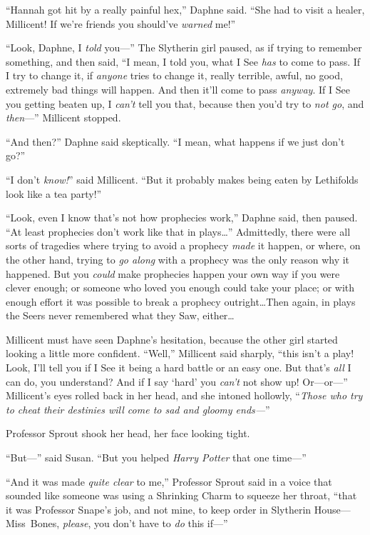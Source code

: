 “Hannah got hit by a really painful hex,” Daphne said. “She had to visit a healer, Millicent! If we’re friends you should’ve \emph{warned} me!”

“Look, Daphne, I \emph{told} you—” The Slytherin girl paused, as if trying to remember something, and then said, “I mean, I told you, what I See \emph{has} to come to pass. If I try to change it, if \emph{anyone} tries to change it, really terrible, awful, no good, extremely bad things will happen. And then it’ll come to pass \emph{anyway}. If I See you getting beaten up, I \emph{can’t} tell you that, because then you’d try to \emph{not go}, and \emph{then}—” Millicent stopped.

“And then?” Daphne said skeptically. “I mean, what happens if we just don’t go?”

“I don’t \emph{know!}” said Millicent. “But it probably makes being eaten by Lethifolds look like a tea party!”

“Look, even I know that’s not how prophecies work,” Daphne said, then paused. “At least prophecies don’t work like that in plays…” Admittedly, there were all sorts of tragedies where trying to avoid a prophecy \emph{made} it happen, or where, on the other hand, trying to \emph{go along} with a prophecy was the only reason why it happened. But you \emph{could} make prophecies happen your own way if you were clever enough; or someone who loved you enough could take your place; or with enough effort it was possible to break a prophecy outright…Then again, in plays the Seers never remembered what they Saw, either…

Millicent must have seen Daphne’s hesitation, because the other girl started looking a little more confident. “Well,” Millicent said sharply, “this isn’t a play! Look, I’ll tell you if I See it being a hard battle or an easy one. But that’s \emph{all} I can do, you understand? And if I say ‘hard’ you \emph{can’t} not show up! Or—or—” Millicent’s eyes rolled back in her head, and she intoned hollowly, “\emph{Those who try to cheat their destinies will come to sad and gloomy ends—}”

\later

Professor Sprout shook her head, her face looking tight.

“But—” said Susan. “But you helped \emph{Harry Potter} that one time—”

“And it was made \emph{quite clear} to me,” Professor Sprout said in a voice that sounded like someone was using a Shrinking Charm to squeeze her throat, “that it was Professor Snape’s job, and not mine, to keep order in Slytherin House—Miss~Bones, \emph{please}, you don’t have to \emph{do} this if—”

